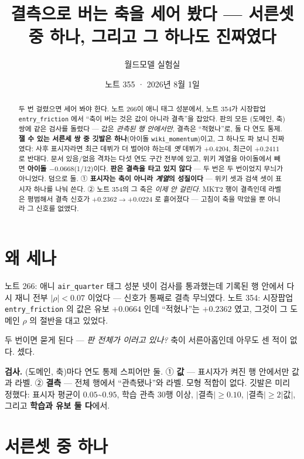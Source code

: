 \documentclass[11pt]{article}
\begin{document}
\title{결측으로 버는 축을 세어 봤다 --- 서른셋 중 하나, 그리고 그 하나도 진짜였다}
\author{월드모델 실험실}
\date{노트 355 · 2026년 8월 1일}
\maketitle

\begin{abstract}
두 번 걸렸으면 세어 봐야 한다. 노트 266이 애니 태그 성분에서, 노트 354가
시장팝업 \texttt{entry\_friction} 에서 ``축이 버는 것은 값이 아니라
결측''을 잡았다. 판의 모든 (도메인, 축) 쌍에 같은 검사를 돌렸다 --- 값은
\emph{관측된 행 안에서만}, 결측은 ``적혔나''로, 둘 다 연도 통제.
\textbf{잴 수 있는 서른세 쌍 중 깃발은 하나}(아이돌
\texttt{wiki\_momentum})이고, 그 하나도 파 보니 진짜였다: 사후 표시자라면
최근 데뷔가 더 벌어야 하는데 \emph{옛} 데뷔가 $+0.4204$, 최근이
$+0.2411$ 로 반대다. 문서 있음/없음 격차는 다섯 연도 구간 전부에 있고,
위키 계열을 아이돌에서 빼면 \textbf{아이돌 $-0.0668$}(1/12)이다.
\textbf{판은 결측을 타고 있지 않다} --- 두 번은 두 번이었지 무늬가 아니었다.
덤으로 둘. ① \textbf{표시자는 축이 아니라 \emph{계열}의 성질이다} --- 위키
셋과 검색 셋이 표시자 하나를 나눠 쓴다. ② 노트 354의 그 축은 \emph{이제
안 걸린다}. MKT2 행이 결측인데 라벨은 평범해서 결측 신호가
$+0.2362 \to +0.0224$ 로 흩어졌다 --- 고침이 축을 막았을 뿐 아니라 그
신호를 없앴다.
\end{abstract}

\section{왜 세나}

노트 266: 애니 \texttt{air\_quarter} 태그 성분 넷이 검사를 통과했는데
기록된 행 안에서 다시 재니 전부 $|\rho|<0.07$ 이었다 --- 신호가 통째로
결측 무늬였다. 노트 354: 시장팝업 \texttt{entry\_friction} 의 값은 유보
$+0.0664$ 인데 ``적혔나''는 $+0.2362$ 였고, 그것이 그 도메인 $\rho$ 의
절반을 대고 있었다.

두 번이면 묻게 된다 --- \emph{판 전체가 이러고 있나?} 축이 서른아홉인데
아무도 센 적이 없다. 셌다.

\textbf{검사.} (도메인, 축)마다 연도 통제 스피어만 둘. ① \textbf{값} ---
표시자가 켜진 행 안에서만 값과 라벨. ② \textbf{결측} --- 전체 행에서
``관측됐나''와 라벨. 모형 적합이 없다. 깃발은 미리 정했다: 표시자 평균이
$0.05$\textasciitilde$0.95$, 학습 관측 30행 이상, $|$결측$| \ge 0.10$,
$|$결측$| \ge 2|$값$|$, 그리고 \textbf{학습과 유보 둘 다}에서.

\section{서른셋 중 하나}
\end{document}

